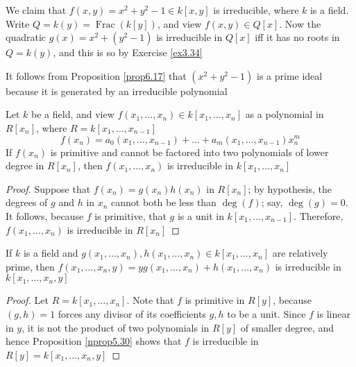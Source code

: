 \documentclass[11pt]{article}
\DeclareMathOperator{\Frac}{Frac}
\begin{document}
\begin{examplle}[]
We claim that \(f(x,y)=x^2+y^2-1\in k[x,y]\) is irreducible, where \(k\) is a
field. Write \(Q=k(y)=\Frac(k[y])\), and view \(f(x,y)\in Q[x]\). Now the
quadratic \(g(x)=x^2+(y^2-1)\) is irreducible in \(Q[x]\) iff it has no roots
in \(Q=k(y)\), and this is so by Exercise \ref{ex3.34}

It follows from Proposition \ref{prop6.17} that \((x^2+y^2-1)\) is a prime
ideal because it is generated by an irreducible polynomial
\end{examplle}

\begin{proposition}[]
\label{nprop5.30}
Let \(k\) be a field, and view \(f(x_1,\dots,x_n)\in k[x_1,\dots,x_n]\) as a
polynomial in \(R[x_n]\), where \(R=k[x_1,\dots,x_{n-1}]\)
\begin{equation*}
f(x_n)=a_0(x_1,\dots,x_{n-1})+\dots+a_m(x_1,\dots,x_{n-1})x^m_n
\end{equation*}
If \(f(x_n)\) is primitive and cannot be factored into two polynomials of
lower degree in \(R[x_n]\), then \(f(x_1,\dots,x_n)\) is irreducible in
\(k[x_1,\dots,x_n]\) 
\end{proposition}

\begin{proof}
Suppose that \(f(x_n)=g(x_n)h(x_n)\) in \(R[x_n]\); by hypothesis, the
degrees of \(g\) and \(h\) in \(x_n\) cannot both be less than \(\deg(f)\); say,
\(\deg(g)=0\). It follows, because \(f\) is primitive, that \(g\) is a unit in
\(k[x_1,\dots,x_{n-1}]\). Therefore, \(f(x_1,\dots,x_n)\) is irreducible in \(R[x_n]\)
\end{proof}

\begin{corollary}[]
\label{ncor5.31}
If \(k\) is a field and 
\(g(x_1,\dots,x_n),h(x_1,\dots,x_n)\in k[x_1,\dots,x_n]\) are relatively
prime, then \(f(x_1,\dots,x_n,y)=yg(x_1,\dots,x_n)+h(x_1,\dots,x_n)\) is
irreducible in \(k[x_1,\dots,x_n,y]\)
\end{corollary}

\begin{proof}
Let \(R=k[x_1,\dots,x_n]\). Note that \(f\) is primitive in \(R[y]\), because
\((g,h)=1\) forces any divisor of its coefficients \(g,h\) to be a unit.
Since \(f\) is linear in \(y\), it is not the product of two polynomials in \(R[y]\)
of smaller degree, and hence Proposition \ref{nprop5.30} shows that \(f\) is
irreducible in \(R[y]=k[x_1,\dots,x_n,y]\)
\end{proof}
\end{document}
